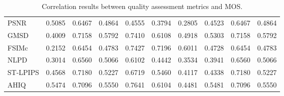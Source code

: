 \begin{table*}[ht]
\begin{tabularx}{\textwidth}{l|X@{}X@{}X|X@{}X@{}X|X@{}X@{}X}
PSNR&0.5085&0.6467&0.4864&0.4555&0.3794&0.2805&0.4523&0.6467&0.4864 \\
GMSD&0.4009&0.7158&0.5792&0.7410&0.6108&0.4918&0.5303&0.7158&0.5792 \\
FSIMc&0.2152&0.6454&0.4783&0.7427&0.7196&0.6011&0.4728&0.6454&0.4783 \\
NLPD&0.3014&0.6560&0.5066&0.6102&0.4442&0.3534&0.3941&0.6560&0.5066 \\
ST-LPIPS&0.4568&0.7180&0.5227&0.6719&0.5460&0.4117&0.4338&0.7180&0.5227 \\
AHIQ&0.5474&0.7096&0.5550&0.7641&0.6104&0.4481&0.5481&0.7096&0.5550 \\
\hline \hline
\end{tabularx}
\caption{Correlation results between quality assessment metrics and MOS.}
\label{table:combined_mos_correlations}
\end{table*}
